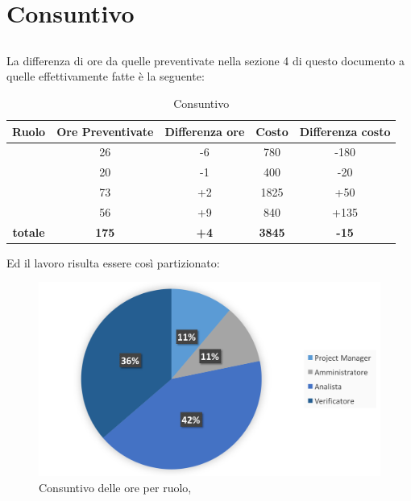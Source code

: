 \section{Consuntivo}

\subsection{\ARM}

La differenza di ore da quelle preventivate nella sezione 4 di questo documento a quelle effettivamente fatte è la seguente:

\begin{table}[h]
	\begin{center}
		\begin{tabular}{|c|c|c|c|c|}
			\hline
			\textbf{Ruolo}	& \textbf{Ore Preventivate} & \textbf{Differenza ore} & \textbf{Costo} & \textbf{Differenza costo}\\
			\hline
			\Pm &	26  &	-6 &	780 &	-180\\
			\hline
			\Am	&	20 &	-1 & 400 & -20\\
			\hline
			\An		&	73 &	+2 & 1825 & +50\\
			\hline
			\Ver	&	56 &	+9 & 840 & +135\\
			\hline
			\textbf{totale}	&	\textbf{175} &	\textbf{+4} & \textbf{3845} & \textbf{-15}\\
			\hline
		\end{tabular}
	\end{center}
	\caption{Consuntivo \ARM}
\end{table}

Ed il lavoro risulta essere così partizionato:

\begin{figure}[H]
	\centering 
	\includegraphics[scale=0.7]{Immagini/Consuntivo/GraficoConsuntivo.png}
	\caption{Consuntivo delle ore per ruolo, \ARM}
\end{figure}

